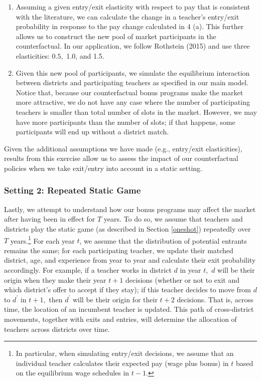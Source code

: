 \documentclass[notitlepage,12pt]{article}%
\begin{document}
\begin{enumerate}
\begin{enumerate}
\item Assuming a given entry/exit elasticity with respect to pay that is
consistent with the literature, we can calculate the change in a teacher's
entry/exit probability in response to the pay change calculated in 4 (a). This
further allows us to construct the new pool of market participants in the
counterfactual. In our application, we follow Rothstein (2015) and use three
elasticities: $0.5,$ 1.0, and 1.5.

\item Given this new pool of participants, we simulate the equilibrium
interaction between districts and participating teachers as specified in our
main model. Notice that, because our counterfactual bonus programs make the
market more attractive, we do not have any case where the number of
participating teachers is smaller than total number of slots in the market.
However, we may have more participants than the number of slots; if that
happens, some participants will end up without a district match.
\end{enumerate}
\end{enumerate}

Given the additional assumptions we have made (e.g., entry/exit elasticities),
results from this exercise allow us to assess the impact of our counterfactual
policies when we take exit/entry into account in a static setting.

\subsubsection{Setting 2: Repeated Static Game\label{repeat}}

Lastly, we attempt to understand how our bonus programs may affect the market
after having been in effect for $T$ years. To do so, we assume that teachers
and districts play the static game (as described in Section \ref{oneshot})
repeatedly over $T$ years.\footnote{In particular, when simulating entry/exit
decisions, we assume that an individual teacher calculates their expected pay
(wage plus bonus) in $t$ based on the equilibrium wage schedules in $t-1$.}
For each year $t$, we assume that the distribution of potential entrants
remains the same; for each participating teacher, we update their matched
district, age, and experience from year to year and calculate their exit
probability accordingly. For example, if a teacher works in district $d$ in
year $t,$ $d$ will be their origin when they make their year $t+1$ decisions
(whether or not to exit and which district's offer to accept if they stay); if
this teacher decides to move from $d$ to $d^{\prime}$ in $t+1,$ then
$d^{\prime}$ will be their origin for their $t+2$ decisions. That is, across
time, the location of an incumbent teacher is updated. This path of
cross-district movements, together with exits and entries, will determine the
allocation of teachers across districts over time.
\end{document}
